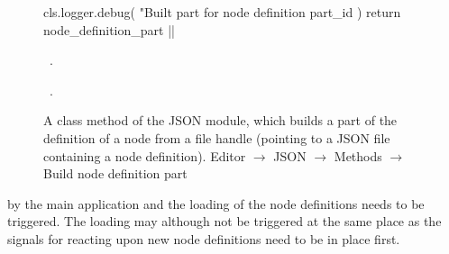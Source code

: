 \documentclass[%
    a4paper,    %
    justified,  %
    nobib,      %
    openany     %
]{tufte-book}
\begin{document}
\begin{figure}
\begin{flushleft}
\begin{minipage}{\linewidth}
\begin{pythoncode}
    cls.logger.debug(
        "Built part for node definition %
        part_id
    )
    return node_definition_part
|\NWsep|
\end{pythoncode}
\vspace{1.5ex}
\footnotesize
\begin{list}{}{\setlength{\itemsep}{-\parsep}\setlength{\itemindent}{-\leftmargin}}
\item \NWtxtMacroDefBy\ .
\item \NWtxtMacroRefIn\ .

\item{}
\end{list}
\end{minipage}\vspace{4ex}
\end{flushleft}
\caption{A class method of the JSON module, which builds a part of the
  definition of a node from a file handle (pointing to a JSON file containing a
  node definition).
  \newline{}\newline{}Editor $\rightarrow$ JSON $\rightarrow$
  Methods $\rightarrow$ Build node definition part}
\label{editor:lst:json:methods:build-node-definition-part}
\end{figure}

 by the main
application and the loading of the node definitions needs to be triggered. The
loading may although not be triggered at the same place as the signals for
reacting upon new node definitions need to be in place first.
\end{document}
